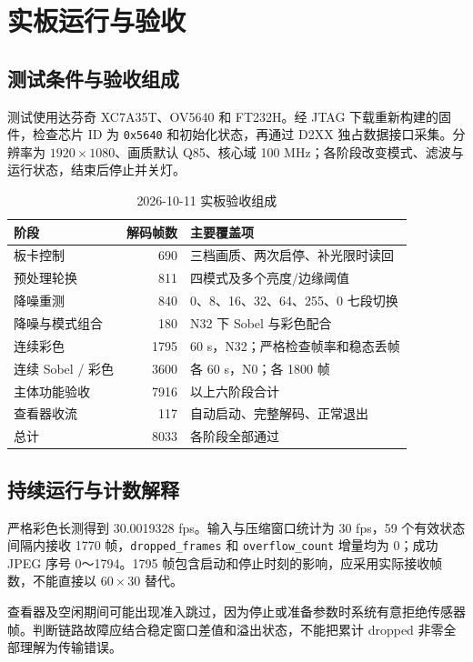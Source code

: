 \clearpage

\section{实板运行与验收}
\subsection{测试条件与验收组成}
测试使用达芬奇 XC7A35T、OV5640 和 FT232H。经 JTAG 下载重新构建的固件，检查芯片 ID 为 \texttt{0x5640} 和初始化状态，再通过 D2XX 独占数据接口采集。分辨率为 $1920\times1080$、画质默认 Q85、核心域 100 MHz；各阶段改变模式、滤波与运行状态，结束后停止并关灯。

\begin{table}[H]\centering\caption{2026-10-11 实板验收组成}
\begin{tabularx}{\linewidth}{@{}l r Y@{}}\toprule
阶段 & 解码帧数 & 主要覆盖项\\\midrule
板卡控制 & 690 & 三档画质、两次启停、补光限时读回\\
预处理轮换 & 811 & 四模式及多个亮度/边缘阈值\\
降噪重测 & 840 & 0、8、16、32、64、255、0 七段切换\\
降噪与模式组合 & 180 & N32 下 Sobel 与彩色配合\\
连续彩色 & 1795 & 60 s，N32；严格检查帧率和稳态丢帧\\
连续 Sobel / 彩色 & 3600 & 各 60 s，N0；各 1800 帧\\\midrule
主体功能验收 & 7916 & 以上六阶段合计\\
查看器收流 & 117 & 自动启动、完整解码、正常退出\\\midrule
总计 & 8033 & 各阶段全部通过\\\bottomrule
\end{tabularx}\end{table}

\subsection{持续运行与计数解释}
严格彩色长测得到 30.0019328 fps。输入与压缩窗口统计为 30 fps，59 个有效状态间隔内接收 1770 帧，\texttt{dropped\_frames} 和 \texttt{overflow\_count} 增量均为 0；成功 JPEG 序号 0～1794。1795 帧包含启动和停止时刻的影响，应采用实际接收帧数，不能直接以 $60\times30$ 替代。

查看器及空闲期间可能出现准入跳过，因为停止或准备参数时系统有意拒绝传感器帧。判断链路故障应结合稳定窗口差值和溢出状态，不能把累计 dropped 非零全部理解为传输错误。

